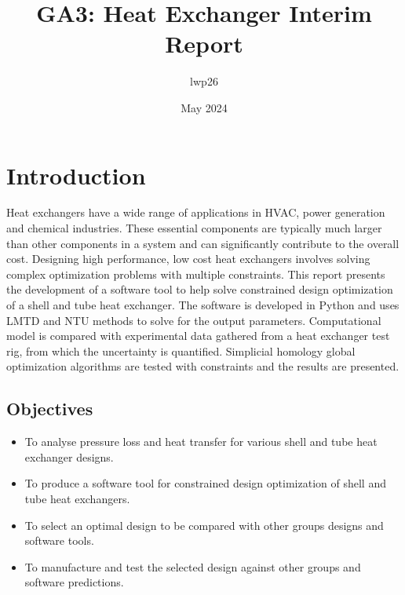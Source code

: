 \documentclass{article}
\begin{document}
\title{GA3: Heat Exchanger Interim Report}
\author{lwp26}
\date{May 2024}
\maketitle 

\section{Introduction}

Heat exchangers have a wide range of applications in HVAC, power generation and chemical industries.
These essential components are typically much larger than other components in a system and can significantly contribute to the overall cost.
Designing high performance, low cost heat exchangers involves solving complex optimization problems with multiple constraints.
This report presents the development of a software tool to help solve constrained design optimization of a shell and tube heat exchanger.
The software is developed in Python and uses LMTD and NTU methods to solve for the output parameters.
Computational model is compared with experimental data gathered from a heat exchanger test rig, from which the uncertainty is quantified.
Simplicial homology global optimization algorithms are tested with constraints and the results are presented.

 
\subsection{Objectives}

\begin{itemize}
    \item To analyse pressure loss and heat transfer for various shell and tube heat exchanger designs.
    \item To produce a software tool for constrained design optimization of shell and tube heat exchangers.
    \item To select an optimal design to be compared with other groups designs and software tools.
    \item To manufacture and test the selected design against other groups and software predictions.
\end{itemize}
\end{document}
